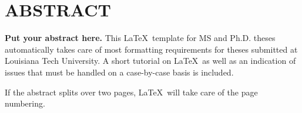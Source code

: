 \chapter*{ABSTRACT}

{\bf Put your abstract here.}
This
\LaTeX \ 
template for MS and Ph.D. theses automatically takes care 
of most formatting requirements for theses submitted at Louisiana
Tech University.
A short tutorial on \LaTeX \ 
as well as an indication of issues that must be 
handled on a case-by-case basis is included.

If the abstract splits over two pages, \LaTeX \ will
take care of the page numbering.


